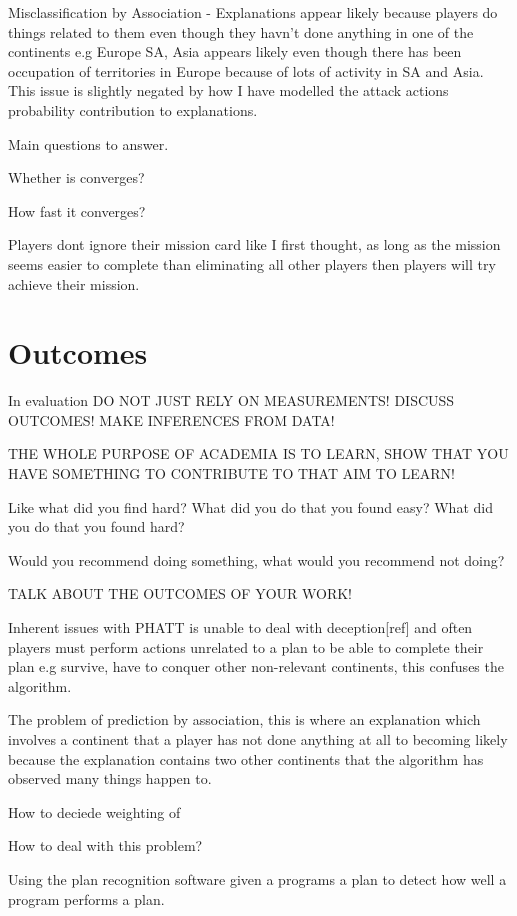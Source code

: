 \documentclass[parskip]{cs4rep}
\begin{document}
Misclassification by Association - Explanations appear likely because players do things related to them even though they havn't done anything in one of the continents e.g Europe SA, Asia appears likely even though there has been occupation of territories in Europe because of lots of activity in SA and Asia. This issue is slightly negated by how I have modelled the attack actions probability contribution to explanations.

Main questions to answer.

Whether is converges?

How fast it converges?

Players dont ignore their mission card like I first thought, as long as the mission seems easier to complete than eliminating all other players then players will try achieve their mission.

\section{Outcomes}

In evaluation DO NOT JUST RELY ON MEASUREMENTS! DISCUSS OUTCOMES! MAKE INFERENCES FROM DATA!

THE WHOLE PURPOSE OF ACADEMIA IS TO LEARN, SHOW THAT YOU HAVE SOMETHING TO CONTRIBUTE TO THAT AIM TO LEARN!

Like what did you find hard? What did you do that you found easy? What did you do that you found hard? 

Would you recommend doing something, what would you recommend not doing?

TALK ABOUT THE OUTCOMES OF YOUR WORK!

Inherent issues with PHATT is unable to deal with deception[ref] and often players must perform actions unrelated to a plan to be able to complete their plan e.g survive, have to conquer other non-relevant continents, this confuses the algorithm.

The problem of prediction by association, this is where an explanation which involves a continent that a player has not done anything at all to becoming likely because the explanation contains two other continents that the algorithm has observed many things happen to.

How to deciede weighting of 

How to deal with this problem?

Using the plan recognition software given a programs a plan to detect how well a program performs a plan. 
\end{document}
